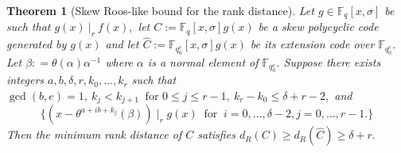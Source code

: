 \documentclass[12pt,paper]{article}
\theoremstyle{plain}
\newtheorem{theorem}{Theorem}[section] %
\newcommand{\Fq}{\mathbb{F}_{q}}
\begin{document}
\begin{theorem}[Skew Roos-like bound for the rank distance]\label{Rank_bound}
Let $g \in \Fq[x,\sigma]$ be such that $ g(x) ~|_r~ f(x),$ let $ C:= \Fq[x,\sigma] g(x)$ be a skew polycyclic code generated by $g(x)$ and let $\widehat{C}:= \mathbb{F}_{q_0^e}[x,\sigma] g(x) $ be its extension code over $ \mathbb{F}_{q_0^e}.$ Let $\beta: = \theta(\alpha)\alpha^{-1}$ where $\alpha$ is a normal element of $ \mathbb{F}_{q_0^e}$. 
    Suppose there exists integers $ a, b, \delta, r, k_0, \dots , k_r$ such that $\gcd( b,e)=1,\  k_j<k_{j+1}\ \text { for } 0 \leq j \leq r-1, \ k_r-k_0 \leq \delta+r-2, $ and  
    $$\{ (x-{\theta^{a+ib+k_j}(\beta)}) \mid_r g(x)  ~\text{ for }~ i=0,\ldots,{\delta-2}, j=0,\ldots, r-1.\}$$ 
    Then  the minimum rank distance of $C$ satisfies     $d_R(C)\geq   d_R(\widehat{C}) \geq {\delta}+ {r}. $
\end{theorem}
\end{document}
